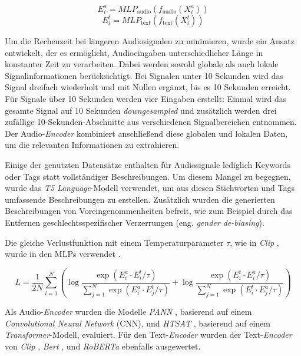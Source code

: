 \documentclass[
  a4paper,  %
  twoside,  %
  bibliography=totoc,
  headsepline,
  cleardoublepage=empty,
  parskip=half,
  draft=false
]{scrbook}
\begin{document}
{\begin{equation}
     E_i^a = M L P_{\text{audio}}\left(f_{\text{audio}}\left(X_i^a\right)\right)
\end{equation}
\begin{equation}
    E_i^t = M L P_{\text{text}}\left(f_{\text{text}}\left(X_i^t\right)\right)
\end{equation}

Um die Rechenzeit bei längeren Audiosignalen zu minimieren, wurde ein Ansatz entwickelt, der es ermöglicht, Audioeingaben unterschiedlicher Länge in konstanter Zeit zu verarbeiten. Dabei werden sowohl globale als auch lokale Signalinformationen berücksichtigt. Bei Signalen unter 10 Sekunden wird das Signal dreifach wiederholt und mit Nullen ergänzt, bis es 10 Sekunden erreicht. Für Signale über 10 Sekunden werden vier Eingaben erstellt: Einmal wird das gesamte Signal auf 10 Sekunden \emph{downgesampled} und zusätzlich werden drei zufällige 10-Sekunden-Abschnitte aus verschiedenen Signalbereichen entnommen. Der Audio-\emph{Encoder} kombiniert anschließend diese globalen und lokalen Daten, um die relevanten Informationen zu extrahieren. \cite{wu_large-scale_2023}

Einige der genutzten Datensätze enthalten für Audiosignale lediglich Keywords oder Tags statt vollständiger Beschreibungen. Um diesem Mangel zu begegnen, wurde das \emph{T5} \cite{raffel_exploring_2020} \emph{Language}-Modell verwendet, um aus diesen Stichworten und Tags umfassende Beschreibungen zu erstellen. Zusätzlich wurden die generierten Beschreibungen von Voreingenommenheiten befreit, wie zum Beispiel durch das Entfernen geschlechtsspezifischer Verzerrungen (eng. \emph{gender de-biasing}). \cite{wu_large-scale_2023}

Die gleiche Verlustfunktion mit einem Temperaturparameter $\tau$, wie in \emph{Clip} \cite{radford_learning_2021}, wurde in den MLPs verwendet \cite{wu_large-scale_2023}.

\begin{equation}
L=\frac{1}{2 N} \sum_{i=1}^N\left(\log \frac{\exp \left(E_i^a \cdot E_i^t / \tau\right)}{\sum_{j=1}^N \exp \left(E_i^a \cdot E_j^t / \tau\right)}+\log \frac{\exp \left(E_i^t \cdot E_i^a / \tau\right)}{\sum_{j=1}^N \exp \left(E_i^t \cdot E_j^a / \tau\right)}\right)
\end{equation}

Als Audio-\emph{Encoder} wurden die Modelle \emph{PANN} \cite{kong_panns_2020}, basierend auf einem \emph{Convolutional Neural Network} (CNN), und \emph{HTSAT} \cite{chen_hts-at_2022}, basierend auf einem \emph{Transformer}-Modell, evaluiert. Für den Text-\emph{Encoder} wurden der Text-\emph{Encoder} von \emph{Clip} \cite{radford_learning_2021}, \emph{Bert} \cite{devlin_bert_2019}, und \emph{RoBERTa} \cite{liu_roberta_2019} ebenfalls ausgewertet. \cite{wu_large-scale_2023}

}
\end{document}

